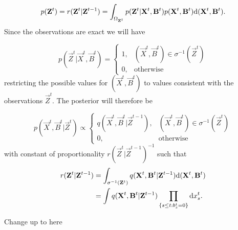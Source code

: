 \begin{equation*}
    p(\mathbf{Z}^t) = r(\mathbf{Z}^t | \mathbf{Z}^{t-1}) = \int_{\Omega_{\mathbf{Z}^t}} p(\mathbf{Z}^t | \mathbf{X}^t, \mathbf{B}^t) p(\mathbf{X}^t, \mathbf{B}^t) \mathrm{d} (\mathbf{X}^t, \mathbf{B}^t).
\end{equation*}
Since the observations are exact we will have

\begin{equation*}
    p(\vec{Z}^t | \vec{X}^t, \vec{B}^t) =
    \begin{cases}
         1, & (\vec{X}^t, \vec{B}^t) \in \sigma^{-1}(\vec{Z}^t) \\
        0, & \text{otherwise}
    \end{cases}
\end{equation*}
restricting the possible values for $(\vec{X}^t, \vec{B}^t)$ to values consistent with the observations $\vec{Z}^t$.
The posterior will therefore be

\begin{equation*}
    p(\vec{X}^t, \vec{B}^t |\vec{Z}^t) \propto 
    \begin{cases}
        q(\vec{X}^t, \vec{B}^t | \vec{Z}^{t-1}), & (\vec{X}^t, \vec{B}^t) \in \sigma^{-1}(\vec{Z}^t) \\
        0, & \text{otherwise}
    \end{cases}
\end{equation*}
with constant of proportionality $r(\vec{Z}^t | \vec{Z}^{t-1})^{-1}$ such that
\begin{align*}
    r(\mathbf{Z}^t | \mathbf{Z}^{t-1}) &= \int_{\sigma^{-1}(\mathbf{Z}^t)} q (\mathbf{X}^t, \mathbf{B}^t | \mathbf{Z}^{t-1}) \mathrm{d} (\mathbf{X}^t, \mathbf{B}^t)\\
    &= \int q(\mathbf{X}^t, \mathbf{B}^t | \mathbf{Z}^{t-1}) \prod_{ \{ s \leq t:b^t_s = 0 \} } \mathrm{d} x_s^t.
\end{align*}

{\color{red} Change up to here}

